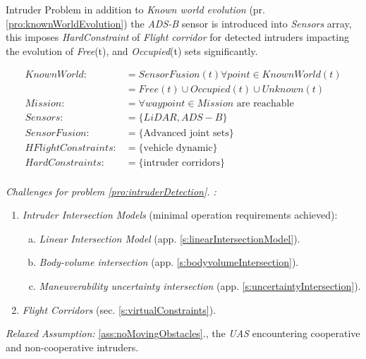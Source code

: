 \begin{problem}{Intruder Problem}\label{pro:intruderDetection}
    in addition to \emph{Known world evolution} (pr.\ref{pro:knownWorldEvolution}) the \emph{ADS-B} sensor is introduced into \emph{Sensors} array, this imposes \emph{HardConstraint} of \emph{Flight corridor} for detected intruders impacting the evolution of \emph{Free}(t), and \emph{Occupied}(t) sets significantly.
    
    \begin{equation}\label{eq:intruderDetectionProblemdefinition}
        \begin{aligned}
            KnownWorld:&= SensorFusion(t)\forall point\in KnownWorld(t)\\
                       &=Free(t) \cup Occupied(t) \cup Unknown(t)\\
            Mission:&= \forall waypoint\in Mission \text{ are reachable}\\
            Sensors:&= \{LiDAR,ADS-B\}\\
            SensorFusion:&= \{\text{Advanced joint sets}\}\\
            HFlightConstraints:&=\{\text{vehicle dynamic}\}\\
            HardConstraints:&=\{\text{intruder corridors}\}\\
        \end{aligned}
    \end{equation}
    

    \noindent \emph{Challenges for problem  \ref{pro:intruderDetection}. :}
    \begin{enumerate}
        \item \emph{Intruder Intersection Models} (minimal operation requirements achieved):
        \begin{enumerate}[a.]
            \item \emph{Linear Intersection Model} (app. \ref{s:linearIntersectionModel}).
            \item \emph{Body-volume intersection} (app. \ref{s:bodyvolumeIntersection}).
            \item \emph{Maneuverability uncertainty intersection} (app. \ref{s:uncertaintyIntersection}).
        \end{enumerate}
        
        \item \emph{Flight Corridors} (sec. \ref{s:virtualConstraints}).
    \end{enumerate}
    
    \noindent \emph{Relaxed Assumption: } \ref{ass:noMovingObstacles}., the \emph{UAS} encountering cooperative and non-cooperative intruders.
\end{problem}





